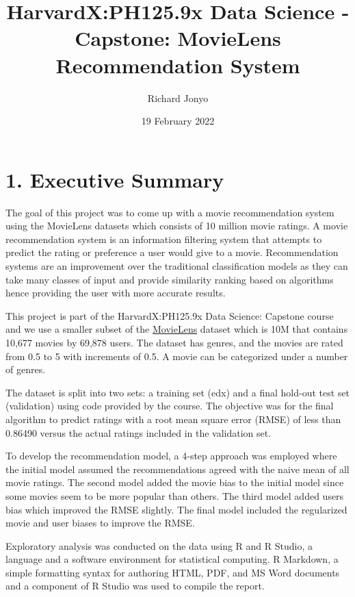 \documentclass[
]{article}
\title{HarvardX:PH125.9x Data Science - Capstone: MovieLens
Recommendation System}
\author{Richard Jonyo}
\date{19 February 2022}
\begin{document}
\maketitle

\hypertarget{executive-summary}{%
\section{1. Executive Summary}\label{executive-summary}}

The goal of this project was to come up with a movie recommendation
system using the MovieLens datasets which consists of 10 million movie
ratings. A movie recommendation system is an information filtering
system that attempts to predict the rating or preference a user would
give to a movie. Recommendation systems are an improvement over the
traditional classification models as they can take many classes of input
and provide similarity ranking based on algorithms hence providing the
user with more accurate results.

This project is part of the HarvardX:PH125.9x Data Science: Capstone
course and we use a smaller subset of the
\href{https://grouplens.org/datasets/movielens/10m/}{MovieLens} dataset
which is 10M that contains 10,677 movies by 69,878 users. The dataset
has genres, and the movies are rated from 0.5 to 5 with increments of
0.5. A movie can be categorized under a number of genres.

The dataset is split into two sets: a training set (edx) and a final
hold-out test set (validation) using code provided by the course. The
objective was for the final algorithm to predict ratings with a root
mean square error (RMSE) of less than 0.86490 versus the actual ratings
included in the validation set.

To develop the recommendation model, a 4-step approach was employed
where the initial model assumed the recommendations agreed with the
naive mean of all movie ratings. The second model added the movie bias
to the initial model since some movies seem to be more popular than
others. The third model added users bias which improved the RMSE
slightly. The final model included the regularized movie and user biases
to improve the RMSE.

Exploratory analysis was conducted on the data using R and R Studio, a
language and a software environment for statistical computing. R
Markdown, a simple formatting syntax for authoring HTML, PDF, and MS
Word documents and a component of R Studio was used to compile the
report.
\end{document}
